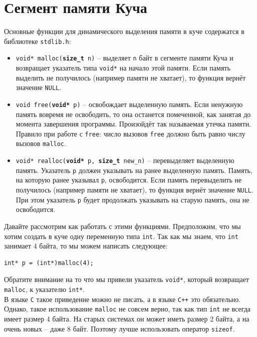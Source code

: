\documentclass[10pt]{article}
\begin{document}
\newpage
\section*{Сегмент памяти Куча}
Основные функции для динамического выделения памяти в куче содержатся в библиотеке \texttt{stdlib.h}:
\begin{itemize}
\item \texttt{void* malloc(\textbf{size\_t} n)} -- выделяет \texttt{n} байт в сегменте памяти Куча и возвращает указатель типа \texttt{void*} на начало этой памяти. Если память выделить не получилось (например памяти не хватает), то функция вернёт значение \texttt{NULL}.
\item \texttt{void free(\textbf{void*} p)} -- освобождает выделенную память. Если ненужную память вовремя не освободить, то она останется помеченной, как занятая до момента завершения программы. Произойдёт так называемая утечка памяти. Правило при работе с \texttt{free}: число вызовов \texttt{free} должно быть равно числу вызовов \texttt{malloc}.
\item \texttt{void* realloc(\textbf{void*} p, \textbf{size\_t} new\_n)} -- перевыделяет выделенную память. Указатель \texttt{p} должен указывать на ранее выделенную память. Память, на которую ранее указывал \texttt{p}, освободится.
Если память перевыделить не получилось (например памяти не хватает), то функция вернёт значение \texttt{NULL}. При этом указатель \texttt{p} будет продолжать указывать на старую память, она не освободится.\\
\end{itemize}

Давайте рассмотрим как работать с этими функциями. Предположим, что мы хотим создать в куче одну переменную типа \texttt{int}. Так как мы знаем, что \texttt{int} занимает 4 байта, то мы можем написать следующее:
\begin{lstlisting}
int* p = (int*)malloc(4);
\end{lstlisting}
Обратите внимание на то что мы привели указатель \texttt{void*}, который возвращает \texttt{malloc}, к указателю \texttt{int*}.\\
В языке \texttt{C} такое приведение можно не писать, а в языке \texttt{C++} это обязательно. Однако, такое использование \texttt{malloc} не совсем верно, так как тип \texttt{int} не всегда имеет размер 4 байта. На старых системах он может иметь размер 2 байта, а на очень новых -- даже 8 байт. Поэтому лучше использовать оператор \texttt{sizeof}.\\
\end{document}
